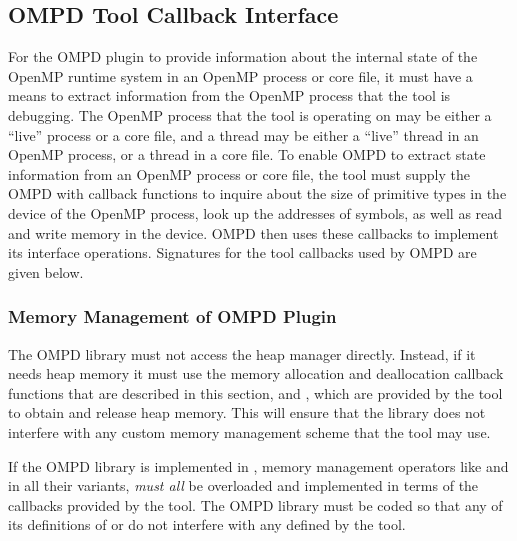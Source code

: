 \subsection{OMPD Tool Callback Interface}
\label{sec:ompd:ompd-tool-callback-interface}

For the OMPD plugin to provide information about the internal state
of the OpenMP runtime system in an OpenMP process or core file,
it must have a means to extract information from
the OpenMP process that the tool is debugging.
The OpenMP process that the tool is operating on may be either a ``live'' process or a core file,
and a thread may be either a ``live'' thread in an OpenMP process,
or a thread in a core file.
To enable OMPD to extract state information from an OpenMP process or core file,
the tool must supply the OMPD with callback functions to inquire
about the size of primitive types in the device of the OpenMP process,
look up the addresses of symbols,
as well as read and write memory in the device.
OMPD then uses these callbacks to implement its interface operations.
Signatures for the tool callbacks used by OMPD are given below.

\subsubsection{Memory Management of OMPD Plugin}
\begin{comment}
The OMPD plugin \emph{must} obtain and release heap memory \emph{only}
using the callbacks provided to it by the tool.
It must \emph{not} call the heap manager directly using \code{malloc}.
For C++ implementations of OMPD this means that \code{new},
\code{new(throw)}, \code{new[]}, \code{delete}, \code{delete(throw)},
and \code{delete[]} in \emph{all} their variants \emph{must} be overloaded,
and implemented in terms of the callback functions
provided to it by the tool.
\end{comment}
The OMPD library must not access the heap manager directly. Instead, if it needs heap memory it 
must use the memory allocation and deallocation callback functions that are described in this 
section,  and ,  which are 
provided by the tool to obtain and release heap memory. This will ensure that the library does not 
interfere with any custom memory management scheme that the tool may use.

If the OMPD library is implemented in , memory management operators like  
and  in all their variants, \emph{must all} be overloaded and implemented in terms of 
the callbacks provided by the tool. The OMPD library must be coded so that any of its 
definitions of  or  do not interfere with any defined by the tool.

